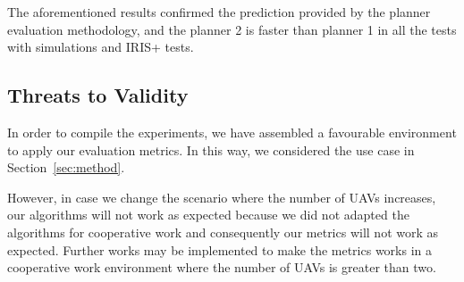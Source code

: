 \documentclass[conference]{IEEEtran}
\begin{document}
	
%
%
	
	The aforementioned results confirmed the prediction provided by the planner evaluation methodology, and the planner 2 is faster than planner 1 in all the tests with simulations and IRIS+ tests.
	
\subsection{Threats to Validity}
\label{sec:ameacas}

In order to compile the experiments, we have assembled a favourable environment to apply our evaluation metrics. In this way, we considered the use case in Section~\ref{sec:method}.

However, in case we change the scenario where the number of UAVs increases, our algorithms will not work as expected because we did not adapted the algorithms for cooperative work and consequently our metrics will not work as expected. Further works may be implemented to make the metrics works in a cooperative work environment where the number of UAVs is greater than two.


%
%
\end{document}
